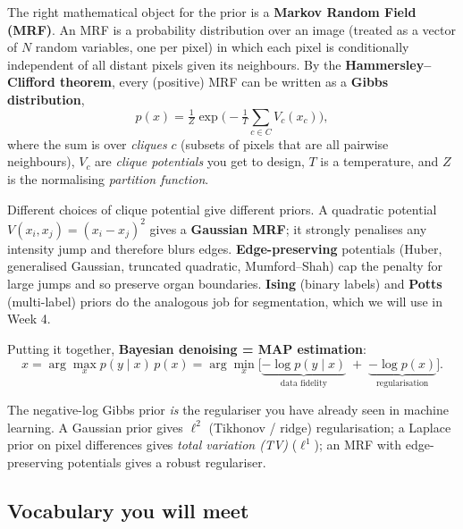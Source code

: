 \documentclass[11pt,a4paper]{article}
\begin{document}
The right mathematical object for the prior is a \textbf{Markov
Random Field (MRF)}. An MRF is a probability distribution over an
image (treated as a vector of $N$ random variables, one per pixel)
in which each pixel is conditionally independent of all distant
pixels given its neighbours. By the \textbf{Hammersley--Clifford
theorem}, every (positive) MRF can be written as a
\textbf{Gibbs distribution},
\begin{equation}
  p(x) = \tfrac{1}{Z}\exp\!\Big(-\tfrac{1}{T}\sum_{c \in C} V_c(x_c)\Big),
  \label{eq:gibbs}
\end{equation}
where the sum is over \emph{cliques} $c$ (subsets of pixels that are
all pairwise neighbours), $V_c$ are \emph{clique potentials} you get
to design, $T$ is a temperature, and $Z$ is the normalising
\emph{partition function}.

Different choices of clique potential give different priors. A
quadratic potential $V(x_i, x_j) = (x_i - x_j)^2$ gives a
\textbf{Gaussian MRF}; it strongly penalises any intensity jump and
therefore blurs edges. \textbf{Edge-preserving} potentials
(Huber, generalised Gaussian, truncated quadratic, Mumford--Shah) cap
the penalty for large jumps and so preserve organ boundaries.
\textbf{Ising} (binary labels) and \textbf{Potts} (multi-label) priors
do the analogous job for segmentation, which we will use in Week 4.

Putting it together, \textbf{Bayesian denoising = MAP estimation}:
\begin{equation}
  \hat x = \arg\max_x p(y \mid x)\,p(x)
         = \arg\min_x \big[\underbrace{-\log p(y \mid x)}_{\text{data fidelity}} \;+\;
                     \underbrace{-\log p(x)}_{\text{regularisation}}\big].
\end{equation}

The negative-log Gibbs prior \emph{is} the regulariser you have
already seen in machine learning. A Gaussian prior gives $\ell^2$
(Tikhonov / ridge) regularisation; a Laplace prior on pixel
differences gives \emph{total variation (TV)} ($\ell^1$); an MRF with
edge-preserving potentials gives a robust regulariser.

\subsection{Vocabulary you will meet}
\end{document}
